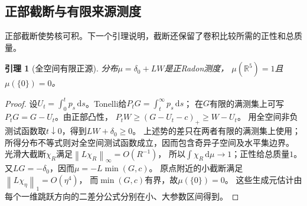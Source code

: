 \documentclass[UTF8,fontset=fandol,zihao=-4,a4paper]{ctexart}
\newtheorem{lemma}[theorem]{引理}
\newcommand{\R}{\mathbb R}
\newcommand{\1}{\mathbf 1}
\newcommand{\dd}{\,\mathrm d}
\newcommand{\norm}[1]{\left\lVert#1\right\rVert}
\begin{document}
\subsection{正部截断与有限来源测度}
正部截断使势核可积。下一个引理说明，截断还保留了卷积比较所需的正性和总质量。
\begin{lemma}[全空间有限正源]\label{lem:source}
分布$\mu=\delta_0+LW$是正Radon测度，
$\mu(\R^5)=1$且$\mu(\{0\})=0$。
\end{lemma}
\begin{proof}
设$U_t=\int_0^tp_s\dd s$。Tonelli给$P_tG=\int_t^\infty p_s\dd s$；
在$G$有限的满测集上可写$P_tG=G-U_t$。由正部凸性，
$P_tW\ge(G-U_t-c)_+\ge W-U_t$。
用全空间非负测试函数取$t\downarrow0$，得到$LW+\delta_0\ge0$。
上述势的差只在两者有限的满测集上使用；所得分布不等式则对全空间测试函数成立，因而包含奇异子空间及水平集边界。
光滑大截断$\chi_R$满足$\norm{L\chi_R}_\infty=O(R^{-1})$，
所以$\int\chi_R\dd\mu\to1$；正性给总质量$1$。
又$LG=-\delta_0$，因而$\mu=-L\min(G,c)$。
原点附近的小截断满足$\norm{L\chi_\eta}_1=O(\eta^4)$，
而$\min(G,c)$有界，故$\mu(\{0\})=0$。
这些生成元估计由每个一维跳跃方向的二差分公式分别在小、大参数区间得到。
\end{proof}
\end{document}
